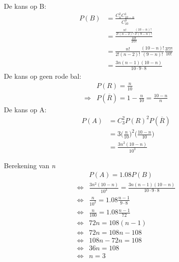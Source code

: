\begin{itemize}[label={}, leftmargin=*]
{{	De kans op B:
	\begin{equation*}
	 \begin{split}
	  P(B) & = \frac{C_{n}^{2}C_{10 - n}^{1}}{C_{10}^{3}} \\
	       & = \frac{\frac{n!}{2!(n-2)!}\frac{(10-n)!}{1!(9-n)!}}{\frac{10!}{3!7!}} \\
	       & = \frac{n!}{2!(n-2)!}\frac{(10-n)!}{(9-n)!}\frac{3!7!}{10!} \\
	       & = \frac{3n(n-1)(10-n)}{10\cdot9\cdot8}
	 \end{split}
	\end{equation*}
	De kans op geen rode bal:
	\begin{equation*}
	 \begin{split}
	  & P(R) = \frac{n}{10} \\
	  \Rightarrow&  P(\overline{R}) = 1 - \frac{n}{10} = \frac{10 - n}{n} 
	 \end{split}
	\end{equation*}
	De kans op A:
	\begin{equation*}
	 \begin{split}
	  P(A) & = C_3^2P(R)^2P(\overline{R}) \\
	  & = 3\bigg(\frac{n}{10}\bigg)^2\bigg(\frac{10 - n}{10}\bigg) \\
	  & = \frac{3n^2(10 - n)}{10^3}
	 \end{split}
	\end{equation*}

	Berekening van \textit{n}
	\begin{equation*}
	 \begin{split}
	  & P(A) = 1.08P(B) \\
	  \Leftrightarrow & \frac{3n^2(10 - n)}{10^3} = \frac{3n(n-1)(10-n)}{10\cdot9\cdot8} \\
	  \Leftrightarrow & \frac{n}{10^2} = 1.08\frac{n - 1}{9\cdot 8} \\
	  \Leftrightarrow & \frac{n}{100} = 1.08\frac{n - 1}{72} \\
	  \Leftrightarrow & 72n = 108(n-1)\\
	  \Leftrightarrow & 72n = 108n - 108 \\
	  \Leftrightarrow & 108n - 72n = 108 \\
	  \Leftrightarrow & 36n = 108 \\
	  \Leftrightarrow & n = 3
	 \end{split}
	\end{equation*}

	  }
	
	
	}
\end{itemize}
